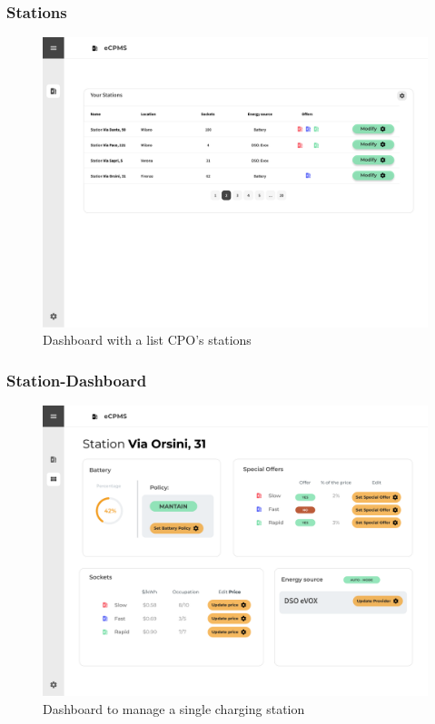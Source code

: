 \subsubsection{Stations}
\begin{center}
    \begin{figure}[H]
        \includegraphics[width=\textwidth]{./img/design/web/home.png}
        \caption{Dashboard with a list CPO's stations}
    \end{figure}
\end{center}

\subsubsection{Station-Dashboard}
\begin{center}
    \begin{figure}[H]
        \includegraphics[width=\textwidth]{./img/design/web/station.png}
        \caption{Dashboard to manage a single charging station}
    \end{figure}
\end{center}